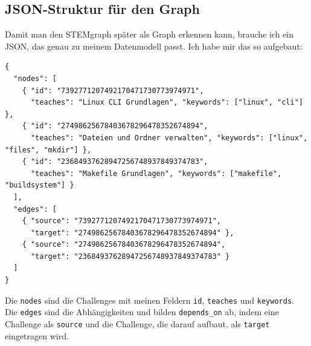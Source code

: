 \subsection{JSON-Struktur für den Graph}

Damit man den STEMgraph später als Graph erkennen kann, brauche ich ein JSON, das
genau zu meinem Datenmodell passt. Ich habe mir das so aufgebaut:

\begin{verbatim}
{
  "nodes": [
    { "id": "7392771207492170471730773974971",
      "teaches": "Linux CLI Grundlagen", "keywords": ["linux", "cli"] },
    { "id": "27498625678403678296478352674894",
      "teaches": "Dateien und Ordner verwalten", "keywords": ["linux", "files", "mkdir"] },
    { "id": "23684937628947256748937849374783",
      "teaches": "Makefile Grundlagen", "keywords": ["makefile", "buildsystem"] }
  ],
  "edges": [
    { "source": "7392771207492170471730773974971",
      "target": "27498625678403678296478352674894" },
    { "source": "27498625678403678296478352674894",
      "target": "23684937628947256748937849374783" }
  ]
}
\end{verbatim}
Die \texttt{nodes} sind die Challenges mit meinen Feldern \texttt{id}, \texttt{teaches} und \texttt{keywords}.
\\
Die \texttt{edges} sind die Abhängigkeiten und bilden \texttt{depends\_on} ab, indem eine
Challenge als \texttt{source} und die Challenge, die darauf aufbaut, als \texttt{target}
eingetragen wird.